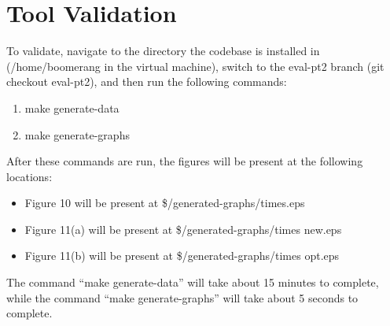 \documentclass[acmsmall,review,anonymous]{acmart}
\begin{document}
\section{Tool Validation}
To validate, navigate to the directory the codebase is installed in
(/home/boomerang in the virtual machine), switch to the eval-pt2
branch (git checkout eval-pt2), and then run the following commands:
\begin{enumerate}
\item make generate-data
\item make generate-graphs
\end{enumerate}

After these commands are run, the figures will be present at the following
locations: 
\begin{itemize}
\item Figure 10 will be present at \$/generated-graphs/times.eps
\item Figure 11(a) will be present at \$/generated-graphs/times\textunderscore
new.eps
\item Figure 11(b) will be present at \$/generated-graphs/times\textunderscore
opt.eps
\end{itemize}

The command ``make generate-data'' will take about 15 minutes to complete, while
the command ``make generate-graphs'' will take about 5 seconds to complete.
\end{document}
